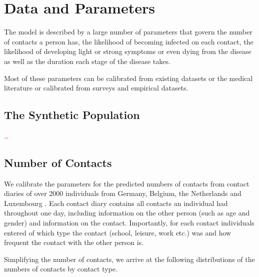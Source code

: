 \section{Data and Parameters}
\label{sec:data_and_parameters}

The model is described by a large number of parameters that govern the number of
contacts a person has, the likelihood of becoming infected on each contact, the
likelihood of developing light or strong symptoms or even dying from the disease as well
as the duration each stage of the disease takes.

Most of these parameters can be calibrated from existing datasets or the medical
literature or calibrated from surveys and empirical datasets.



\FloatBarrier

\subsection{The Synthetic Population}

\textcolor{red}{\ldots}

\FloatBarrier


\subsection{Number of Contacts}
\label{sub:number_of_contacts}

We calibrate the parameters for the predicted numbers of contacts from contact diaries
of over 2000 individuals from Germany, Belgium, the Netherlands and Luxembourg
\citep{Mossong2008}. Each contact diary contains all contacts an individual had
throughout one day, including information on the other person (such as age and gender)
and information on the contact. Importantly, for each contact individuals entered of
which type the contact (school, leisure, work etc.) was and how frequent the contact
with the other person is.

Simplifying the number of contacts, we arrive at the following distributions of the
numbers of contacts by contact type.

